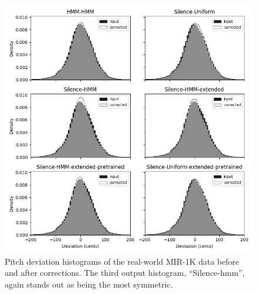 \begin{figure}[t]
    \centering
    \includegraphics[width=\columnwidth]{figures/mir-1k-comparison.png}
    \caption{Pitch deviation histograms of the real-world MIR-1K data before and after corrections. The third output histogram, ``Silence-\gls{hmm}'', again stands out as being the most symmetric.}
    \label{fig:mir-1k-comparison}
\end{figure}


